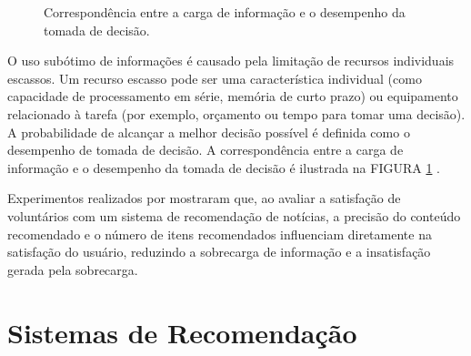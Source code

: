 \vspace{0.2cm}
\begin{figure}[h]
    \caption{Correspondência entre a carga de informação e o desempenho da tomada
    de decisão.}
    \label{fig:u_invertida}
\end{figure}
\vspace{0.2cm}

O uso subótimo de informações é causado
pela limitação de recursos individuais escassos. Um recurso escasso pode ser uma
característica individual (como capacidade de processamento em série, memória de
curto prazo) ou equipamento relacionado à tarefa (por exemplo, orçamento ou
tempo para tomar uma decisão). A probabilidade de alcançar a melhor decisão
possível é definida como o desempenho de tomada de decisão. A correspondência
entre a carga de informação e o desempenho da tomada de decisão é ilustrada na
FIGURA \ref{fig:u_invertida} \cite{roetzel2019information}.

Experimentos realizados por \citet{liang2006personalized} mostraram que, ao
avaliar a satisfação de voluntários com um sistema de recomendação de notícias,
a precisão do conteúdo recomendado e o número de itens
recomendados influenciam diretamente na satisfação do usuário, reduzindo a
sobrecarga de informação e a insatisfação gerada pela sobrecarga.

\section{Sistemas de Recomendação}

